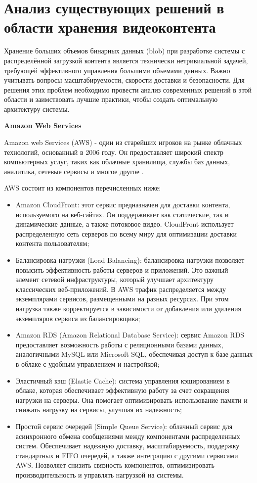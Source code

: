 \section{Анализ существующих решений в области хранения видеоконтента}
	Хранение больших объемов бинарных данных (blob) при разработке системы с распределённой загрузкой контента является технически нетривиальной задачей, требующей эффективного управления большими объемами данных. Важно учитывать вопросы масштабируемости, скорости доставки и безопасности. Для решения этих проблем необходимо провести анализ современных решений в этой области и заимствовать лучшие практики, чтобы создать оптимальную архитектуру системы.

	\textbf{Amazon Web Services}
	
	Amazon web Services (AWS) - один из старейших игроков на рынке облачных технологий, основанный в 2006 году. Он предоставляет широкий спектр компьютерных услуг, таких как облачные хранилища, службы баз данных, аналитика, сетевые сервисы и многое другое \cite{muftiCloudReview}.

	AWS состоит из компонентов перечисленных ниже:
	\begin{itemize}[label=$\bullet$]
		\item Amazon CloudFront: этот сервис предназначен для доставки контента, используемого на веб-сайтах. Он поддерживает как статические, так и динамические данные, а также потоковое видео. CloudFront использует распределенную сеть серверов по всему миру для оптимизации доставки контента пользователям;
		\item Балансировка нагрузки (Load Balancing): балансировка нагрузки позволяет повысить эффективность работы серверов и приложений. Это важный элемент сетевой инфраструктуры, который улучшает архитектуру классических веб-приложений. В AWS трафик распределяется между экземплярами сервисов, размещенными на разных ресурсах. При этом нагрузка также корректируется в зависимости от добавления или удаления экземпляров сервиса из балансировщика;
		\item Amazon RDS (Amazon Relational Database Service): сервис Amazon RDS предоставляет возможность работы с реляционными базами данных, аналогичными MySQL или Microsoft SQL, обеспечивая доступ к базе данных в облаке с удобным управлением и настройкой;
		\item Эластичный кэш (Elastic Cache): система управления кэшированием в облаке, которая обеспечивает эффективную работу за счет сокращения нагрузки на серверы. Она помогает оптимизировать использование памяти и снижать нагрузку на сервисы, улучшая их надежность;
		\item Простой сервис очередей (Simple Queue Service): облачный сервис для асинхронного обмена сообщениями между компонентами распределенных систем. Обеспечивает надежную доставку, масштабируемость, поддержку стандартных и FIFO очередей, а также интеграцию с другими сервисами AWS. Позволяет снизить связность компонентов, оптимизировать производительность и управлять нагрузкой на системы.
	\end{itemize}

